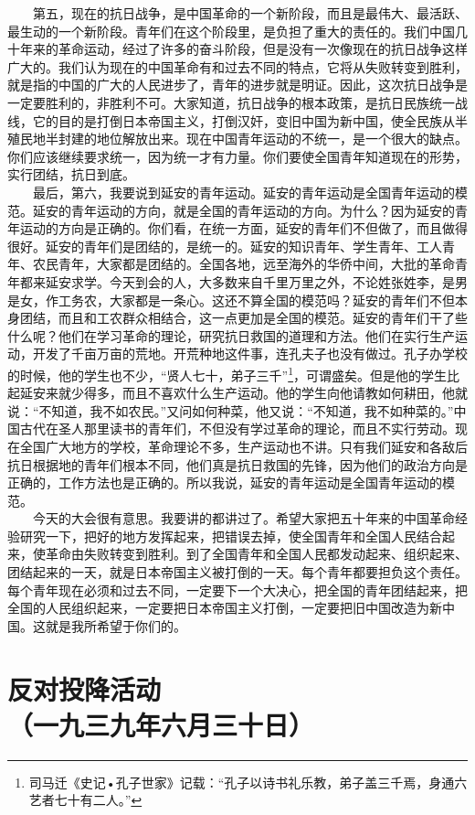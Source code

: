 \documentclass[cn,11pt,chinese]{elegantbook}
\def\myformat#1{\hfil\hfil #1}
\begin{document}
　　第五，现在的抗日战争，是中国革命的一个新阶段，而且是最伟大、最活跃、最生动的一个新阶段。青年们在这个阶段里，是负担了重大的责任的。我们中国几十年来的革命运动，经过了许多的奋斗阶段，但是没有一次像现在的抗日战争这样广大的。我们认为现在的中国革命有和过去不同的特点，它将从失败转变到胜利，就是指的中国的广大的人民进步了，青年的进步就是明证。因此，这次抗日战争是一定要胜利的，非胜利不可。大家知道，抗日战争的根本政策，是抗日民族统一战线，它的目的是打倒日本帝国主义，打倒汉奸，变旧中国为新中国，使全民族从半殖民地半封建的地位解放出来。现在中国青年运动的不统一，是一个很大的缺点。你们应该继续要求统一，因为统一才有力量。你们要使全国青年知道现在的形势，实行团结，抗日到底。\\
　　最后，第六，我要说到延安的青年运动。延安的青年运动是全国青年运动的模范。延安的青年运动的方向，就是全国的青年运动的方向。为什么？因为延安的青年运动的方向是正确的。你们看，在统一方面，延安的青年们不但做了，而且做得很好。延安的青年们是团结的，是统一的。延安的知识青年、学生青年、工人青年、农民青年，大家都是团结的。全国各地，远至海外的华侨中间，大批的革命青年都来延安求学。今天到会的人，大多数来自千里万里之外，不论姓张姓李，是男是女，作工务农，大家都是一条心。这还不算全国的模范吗？延安的青年们不但本身团结，而且和工农群众相结合，这一点更加是全国的模范。延安的青年们干了些什么呢？他们在学习革命的理论，研究抗日救国的道理和方法。他们在实行生产运动，开发了千亩万亩的荒地。开荒种地这件事，连孔夫子也没有做过。孔子办学校的时候，他的学生也不少，“贤人七十，弟子三千”\footnote[12]{ 司马迁《史记•孔子世家》记载：“孔子以诗书礼乐教，弟子盖三千焉，身通六艺者七十有二人。”}，可谓盛矣。但是他的学生比起延安来就少得多，而且不喜欢什么生产运动。他的学生向他请教如何耕田，他就说：“不知道，我不如农民。”又问如何种菜，他又说：“不知道，我不如种菜的。”中国古代在圣人那里读书的青年们，不但没有学过革命的理论，而且不实行劳动。现在全国广大地方的学校，革命理论不多，生产运动也不讲。只有我们延安和各敌后抗日根据地的青年们根本不同，他们真是抗日救国的先锋，因为他们的政治方向是正确的，工作方法也是正确的。所以我说，延安的青年运动是全国青年运动的模范。\\
　　今天的大会很有意思。我要讲的都讲过了。希望大家把五十年来的中国革命经验研究一下，把好的地方发挥起来，把错误去掉，使全国青年和全国人民结合起来，使革命由失败转变到胜利。到了全国青年和全国人民都发动起来、组织起来、团结起来的一天，就是日本帝国主义被打倒的一天。每个青年都要担负这个责任。每个青年现在必须和过去不同，一定要下一个大决心，把全国的青年团结起来，把全国的人民组织起来，一定要把日本帝国主义打倒，一定要把旧中国改造为新中国。这就是我所希望于你们的。\\
\newpage\section*{\myformat{反对投降活动}\\\myformat{（一九三九年六月三十日）}}
\end{document}
